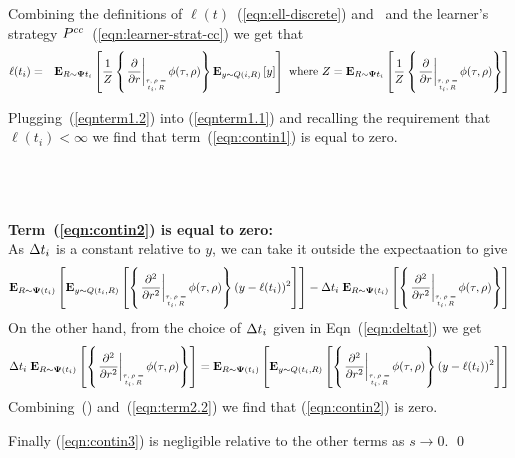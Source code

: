 \documentclass{article}[12pt]
\begin{document}
Combining the definitions of $\ell(t)$~(\ref{eqn:ell-discrete}) and~
and the learner's strategy
$P^{cc}$~(\ref{eqn:learner-strat-cc}) we get that
\begin{eqnarray}
\ell(t_i) &=& \E{\R \sim \state{t_i}}{\frac{1}{Z}
              \at{\frac{\partial}{\partial r}}
              \E{y \sim \adversM(i,\R)}{y}} \mbox{ where }
              Z=\E{\R \sim \state{t_i}}{\frac{1}{Z}
              \at{\frac{\partial}{\partial r}}}
              \label{eqnterm1.2}
\end{eqnarray}

Plugging~(\ref{eqnterm1.2}) into (\ref{eqnterm1.1}) and recalling the
requirement that $\ell(t_i)<\infty$ we find that
term~(\ref{eqn:contin1}) is equal to zero.


~\\~\\~\\
{\bf Term~(\ref{eqn:contin2}) is equal to zero:}\\
As $\Delta t_i$ is a constant relative to $y$, we can take it
outside the expectaation to give 
\begin{equation} \label{eqn:term2.1}
  \E{\R \sim \state(t_i)}{\E{y \sim
      \adversM(t_i,\R)}{\at{\frac{\partial^2}{\partial r^2}}
      (y-\ell(t_i))^2}}
  - \deltat_i  \;  \E{\R \sim \state(t_i)}{\at{\frac{\partial^2}{\partial r^2}}}
\end{equation}
On the other hand, from the choice of $\Delta t_i$ given in
Eqn~(\ref{eqn:deltat}) we get
\begin{equation} \label{eqn:term2.2}
  \deltat_i \; \E{\R \sim \state(t_i)}{\at{\frac{\partial^2}{\partial r^2}}} = 
  \E{\R \sim \state(t_i)}{\E{y \sim \adversM(t_i,R)}{
      \at{\frac{\partial^2}{\partial r^2}} (y-\ell(t_i))^2}}
\end{equation}
Combining~(\label{eqn:term2.1}) and~(\ref{eqn:term2.2}) we
find that (\ref{eqn:contin2}) is zero.

Finally (\ref{eqn:contin3}) is negligible relative to the other terms
as $s \to 0$.
\qed 
\end{document}
